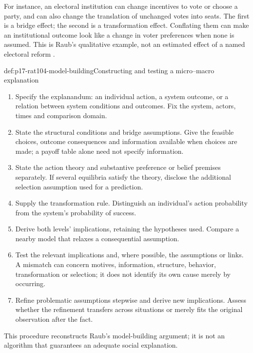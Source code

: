 For instance, an electoral institution can change incentives to vote or
choose a party, and can also change the translation of unchanged votes into
seats. The first is a bridge effect; the second is a transformation effect.
Conflating them can make an institutional outcome look like a change in
voter preferences when none is assumed. This is Raub's qualitative example,
not an estimated effect of a named electoral reform
\parencite[p.~618]{Raub2021RationalChoiceSocialSciences}.

\begin{hbmethod}{def:p17-rat104-model-building}{Constructing and testing a micro--macro explanation}
\begin{enumerate}
\item Specify the explanandum: an individual action, a system outcome, or a
      relation between system conditions and outcomes. Fix the system,
      actors, times and comparison domain.
\item State the structural conditions and bridge assumptions. Give the
      feasible choices, outcome consequences and information available when
      choices are made; a payoff table alone need not specify information.
\item State the action theory and substantive preference or belief premises
      separately. If several equilibria satisfy the theory, disclose the
      additional selection assumption used for a prediction.
\item Supply the transformation rule. Distinguish an individual's action
      probability from the system's probability of success.
\item Derive both levels' implications, retaining the hypotheses used.
      Compare a nearby model that relaxes a consequential assumption.
\item Test the relevant implications and, where possible, the assumptions
      or links. A mismatch can concern motives, information, structure,
      behavior, transformation or selection; it does not identify its own
      cause merely by occurring.
\item Refine problematic assumptions stepwise and derive new implications.
      Assess whether the refinement transfers across situations or merely
      fits the original observation after the fact.
\end{enumerate}
This procedure reconstructs Raub's model-building argument; it is not an
algorithm that guarantees an adequate social explanation.
\end{hbmethod}

